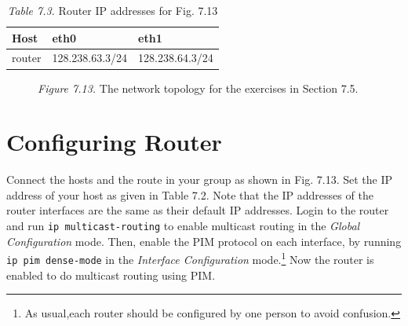 \documentclass{../UTNetLab}
\begin{document}
    \begin{table}[H]
		\caption{\textit{Table 7.3.} Router IP addresses for Fig. 7.13}
		\label{tbl:7.3}
        \vspace{5pt}
        \centering
        \large
        \begin{tabular}{ *3l }
            \hline \hline
            Host & eth0 & eth1 \\
            \hline
            router & 128.238.63.3/24 & 128.238.64.3/24 \\
            \hline \hline
            \end{tabular}
    \end{table}

    \begin{figure}[H]
        \centering
		\caption{\textit{Figure 7.13.} The network topology for the exercises in Section 7.5.}
		\label{fig:7.13}
    \end{figure}

\section{Configuring Router}
\label{sec:config-router}
    Connect the hosts and the route in your group as shown in Fig. 7.13. Set the IP address of your host as given in Table 7.2. Note that the IP addresses of the router interfaces are the same as their default IP addresses.
    Login to the router and run \lstinline{ip multicast-routing} to enable multicast routing in the \textit{Global Configuration} mode.
    Then, enable the PIM protocol on each interface, by running \lstinline{ip pim dense-mode} in the \textit{Interface Configuration} mode.\footnote{As usual,each router should be configured by one person to avoid confusion.} Now the router is enabled to do multicast routing using PIM.
\end{document}
